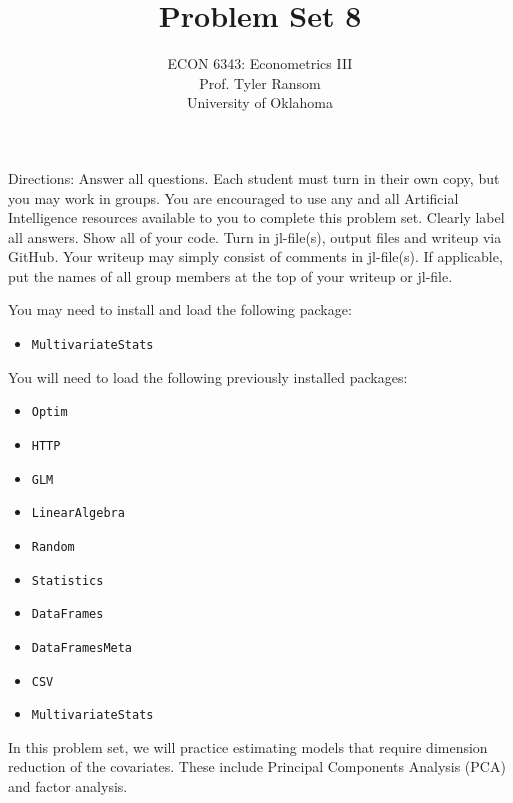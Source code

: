 \documentclass[12pt,english]{article}
\begin{document}
\title{Problem Set 8}
\author{ECON 6343: Econometrics III\\
Prof. Tyler Ransom\\
University of Oklahoma}
\date{}%

\maketitle
Directions: Answer all questions. Each student must turn in their own copy, but you may work in groups. You are encouraged to use any and all Artificial Intelligence resources available to you to complete this problem set. Clearly label all answers. Show all of your code. Turn in jl-file(s), output files and writeup via GitHub. Your writeup may simply consist of comments in jl-file(s). If applicable, put the names of all group members at the top of your writeup or jl-file.

You may need to install and load the following package:
\begin{itemize}
 \item[~] \texttt{MultivariateStats}
\end{itemize}

You will need to load the following previously installed packages:
\begin{itemize}
    \item[~] \texttt{Optim} 
    \item[~] \texttt{HTTP} 
    \item[~] \texttt{GLM} 
    \item[~] \texttt{LinearAlgebra} 
    \item[~] \texttt{Random} 
    \item[~] \texttt{Statistics} 
    \item[~] \texttt{DataFrames} 
    \item[~] \texttt{DataFramesMeta} 
    \item[~] \texttt{CSV} 
    \item[~] \texttt{MultivariateStats} 
\end{itemize}
\pagebreak
In this problem set, we will practice estimating models that require dimension reduction of the covariates. These include Principal Components Analysis (PCA) and factor analysis.
\end{document}
